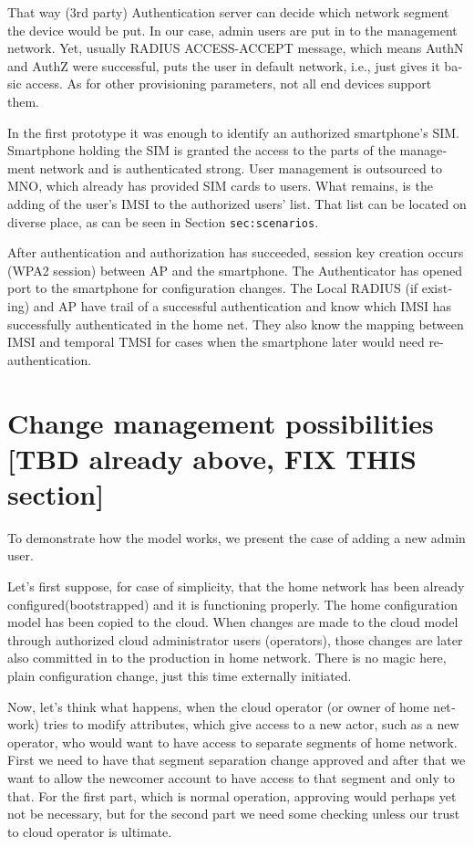 \documentclass[12pt,a4paper,english]{tutthesis}
\begin{document}
\begin{otherlanguage}{english}
That way (3rd party) Authentication server can decide which network
segment the device would be put.  In our case, admin users are put in
to the management network.  Yet, usually RADIUS ACCESS-ACCEPT message,
which means AuthN and AuthZ were successful,  puts the user in
default network, i.e., just gives it basic access. As for other
provisioning parameters, not all end devices support them.

In the first prototype it was enough to identify an authorized
smartphone's SIM.  Smartphone holding the SIM is granted the access to
the parts of the management network and is authenticated strong.  User
management is outsourced to MNO, which
already has provided SIM cards to users. What remains, is the adding
of the user's IMSI to the authorized users' list. That list can be
located on diverse place, as can be seen in Section \texttt{sec:scenarios}.


After authentication and authorization has succeeded, session key
creation occurs (WPA2 session) between AP and the smartphone. 
The Authenticator has opened port to the smartphone for
configuration changes. 
The Local RADIUS (if existing) and AP have trail of a successful
authentication and know which IMSI has successfully authenticated in
the home net. They also know the mapping between IMSI and temporal TMSI for
cases when the smartphone later would need re-authentication.


\section{Change management possibilities [TBD already above, FIX THIS section]}
\label{sec-4-3}




To demonstrate how the model works, we present the case of adding a
new admin user.

Let's first suppose, for case of simplicity, that the home network has been
already configured(bootstrapped) and it is functioning properly.  The
home configuration model has been copied to the cloud.
When changes are made to the cloud model through authorized cloud
administrator users (operators), those changes are later also committed
in to the production in home network. There is no magic here, plain
configuration change, just this time externally initiated.

Now, let's think what happens, when the cloud operator (or owner of
home network) tries to modify attributes, which give access to a new actor,
such as a new operator, who would want to have access to separate
segments of home network.  First we need to have that segment separation
change approved and after that we want to allow the newcomer account
to have access to that segment and only to that. For the first part,
which is normal operation, approving would perhaps yet not be
necessary, but for the second part we need some checking unless our
trust to cloud operator is ultimate.  





\end{otherlanguage}
\end{document}
